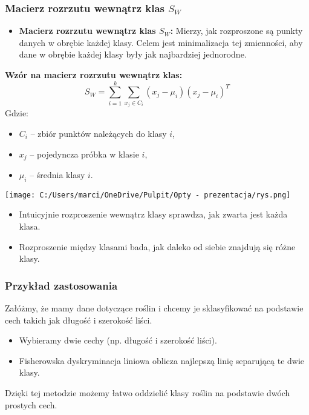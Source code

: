 \documentclass{beamer}
\begin{document}
\begin{frame}
    \frametitle{Macierz rozrzutu wewnątrz klas \( S_W \)}

    \begin{itemize}
        \item \textbf{Macierz rozrzutu wewnątrz klas \( S_W \):}  
        Mierzy, jak rozproszone są punkty danych w obrębie każdej klasy. Celem jest minimalizacja tej zmienności, aby dane w obrębie każdej klasy były jak najbardziej jednorodne.
    \end{itemize}

    \bigskip
    \textbf{Wzór na macierz rozrzutu wewnątrz klas:}
    \[
    S_W = \sum_{i=1}^{k} \sum_{x_j \in C_i} (x_j - \mu_i)(x_j - \mu_i)^T
    \]
    Gdzie:
    \begin{itemize}
        \item \( C_i \) – zbiór punktów należących do klasy \( i \),
        \item \( x_j \) – pojedyncza próbka w klasie \( i \),
        \item \( \mu_i \) – średnia klasy \( i \).
    \end{itemize}
\end{frame}



\begin{frame}
    \texttt{[image: C:/Users/marci/OneDrive/Pulpit/Opty - prezentacja/rys.png]}
    
    \bigskip
    \begin{itemize}
        \item Intuicyjnie rozproszenie wewnątrz klasy sprawdza, jak zwarta jest każda klasa.
        \item Rozproszenie między klasami bada, jak daleko od siebie znajdują się różne klasy.
    \end{itemize}
\end{frame}


\begin{frame}
    \frametitle{Przykład zastosowania}
    Załóżmy, że mamy dane dotyczące roślin i chcemy je sklasyfikować na podstawie cech takich jak długość i szerokość liści. 
    \begin{itemize}
        \item Wybieramy dwie cechy (np. długość i szerokość liści).
        \item Fisherowska dyskryminacja liniowa oblicza najlepszą linię separującą te dwie klasy.
    \end{itemize}
    
    Dzięki tej metodzie możemy łatwo oddzielić klasy roślin na podstawie dwóch prostych cech.
\end{frame}
\end{document}
